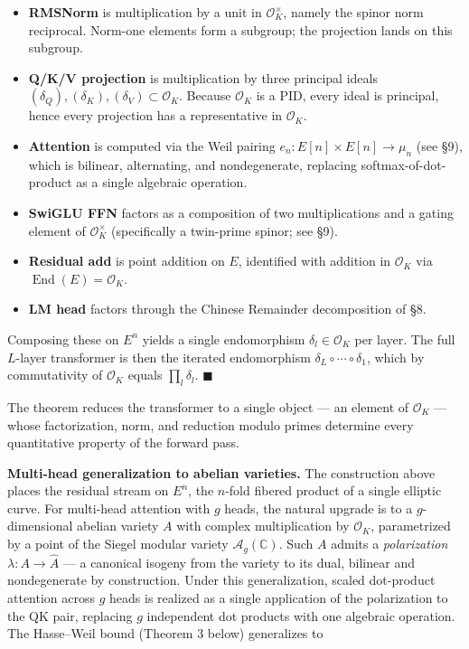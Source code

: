 \documentclass[
  11pt,
]{article}
\providecommand{\tightlist}{%
  \setlength{\itemsep}{0pt}\setlength{\parskip}{0pt}}
\begin{document}
\begin{itemize}
\tightlist
\item
  \textbf{RMSNorm} is multiplication by a unit in
  \(\mathcal{O}_K^\times\), namely the spinor norm reciprocal. Norm-one
  elements form a subgroup; the projection lands on this subgroup.
\item
  \textbf{Q/K/V projection} is multiplication by three principal ideals
  \((\delta_Q), (\delta_K), (\delta_V) \subset \mathcal{O}_K\). Because
  \(\mathcal{O}_K\) is a PID, every ideal is principal, hence every
  projection has a representative in \(\mathcal{O}_K\).
\item
  \textbf{Attention} is computed via the Weil pairing
  \(e_n : E[n] \times E[n] \to \mu_n\) (see §9), which is bilinear,
  alternating, and nondegenerate, replacing softmax-of-dot-product as a
  single algebraic operation.
\item
  \textbf{SwiGLU FFN} factors as a composition of two multiplications
  and a gating element of \(\mathcal{O}_K^\times\) (specifically a
  twin-prime spinor; see §9).
\item
  \textbf{Residual add} is point addition on \(E\), identified with
  addition in \(\mathcal{O}_K\) via
  \(\operatorname{End}(E) = \mathcal{O}_K\).
\item
  \textbf{LM head} factors through the Chinese Remainder decomposition
  of §8.
\end{itemize}

Composing these on \(E^n\) yields a single endomorphism
\(\delta_l \in \mathcal{O}_K\) per layer. The full \(L\)-layer
transformer is then the iterated endomorphism
\(\delta_L \circ \cdots \circ \delta_1\), which by commutativity of
\(\mathcal{O}_K\) equals \(\prod_l \delta_l\). \(\blacksquare\)

The theorem reduces the transformer to a single object --- an element of
\(\mathcal{O}_K\) --- whose factorization, norm, and reduction modulo
primes determine every quantitative property of the forward pass.

\textbf{Multi-head generalization to abelian varieties.} The
construction above places the residual stream on \(E^n\), the \(n\)-fold
fibered product of a single elliptic curve. For multi-head attention
with \(g\) heads, the natural upgrade is to a \(g\)-dimensional abelian
variety \(A\) with complex multiplication by \(\mathcal{O}_K\),
parametrized by a point of the Siegel modular variety
\(\mathcal{A}_g(\mathbb{C})\). Such \(A\) admits a \emph{polarization}
\(\lambda: A \to \widehat{A}\) --- a canonical isogeny from the variety
to its dual, bilinear and nondegenerate by construction. Under this
generalization, scaled dot-product attention across \(g\) heads is
realized as a single application of the polarization to the QK pair,
replacing \(g\) independent dot products with one algebraic operation.
The Hasse--Weil bound (Theorem 3 below) generalizes to
\end{document}
